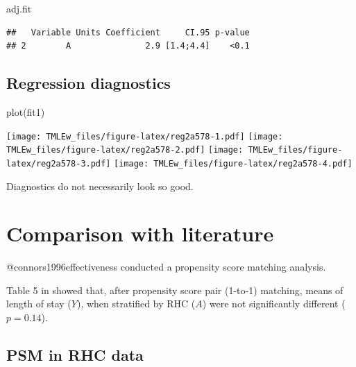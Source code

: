 \documentclass[
]{book}
\newenvironment{Shaded}{\begin{snugshade}}{\end{snugshade}}
\newcommand{\FunctionTok}[1]{\textcolor[rgb]{0.00,0.00,0.00}{#1}}
\newcommand{\NormalTok}[1]{#1}
\begin{document}
\begin{Shaded}
\begin{Highlighting}[]
\NormalTok{adj.fit}
\end{Highlighting}
\end{Shaded}

\begin{verbatim}
##   Variable Units Coefficient     CI.95 p-value
## 2        A               2.9 [1.4;4.4]    <0.1
\end{verbatim}

\hypertarget{regression-diagnostics}{%
\subsection{Regression diagnostics}\label{regression-diagnostics}}

\begin{Shaded}
\begin{Highlighting}[]
\FunctionTok{plot}\NormalTok{(fit1)}
\end{Highlighting}
\end{Shaded}

\texttt{[image: TMLEw\_files/figure-latex/reg2a578-1.pdf]} \texttt{[image: TMLEw\_files/figure-latex/reg2a578-2.pdf]} \texttt{[image: TMLEw\_files/figure-latex/reg2a578-3.pdf]} \texttt{[image: TMLEw\_files/figure-latex/reg2a578-4.pdf]}

\begin{rmdcomment}
Diagnostics do not necessarily look so good.
\end{rmdcomment}

\hypertarget{comparison-with-literature}{%
\section{Comparison with literature}\label{comparison-with-literature}}

\begin{rmdcomment}
@connors1996effectiveness conducted a propensity score matching
analysis.
\end{rmdcomment}

Table 5 in \citet{connors1996effectiveness} showed that, after propensity score pair (1-to-1) matching, means of length of stay (\(Y\)), when stratified by RHC (\(A\)) were not significantly different (\(p = 0.14\)).

\hypertarget{psm-in-rhc-data}{%
\subsection{PSM in RHC data}\label{psm-in-rhc-data}}
\end{document}
